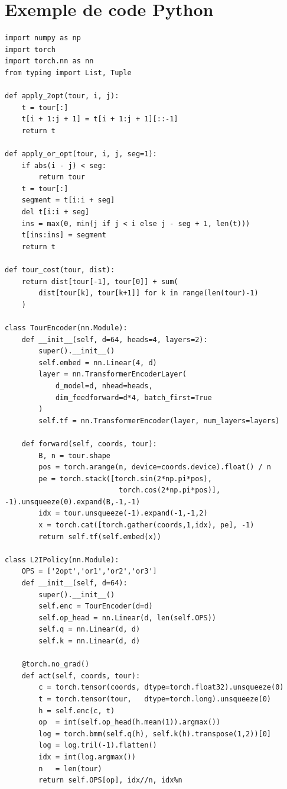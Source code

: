\documentclass[11pt,a4paper]{article}
\begin{document}
\section{Exemple de code Python}

\begin{lstlisting}[caption={L2I minimal : politique Transformer + opérateurs locaux}]
import numpy as np
import torch
import torch.nn as nn
from typing import List, Tuple

def apply_2opt(tour, i, j):
    t = tour[:]
    t[i + 1:j + 1] = t[i + 1:j + 1][::-1]
    return t

def apply_or_opt(tour, i, j, seg=1):
    if abs(i - j) < seg:
        return tour
    t = tour[:]
    segment = t[i:i + seg]
    del t[i:i + seg]
    ins = max(0, min(j if j < i else j - seg + 1, len(t)))
    t[ins:ins] = segment
    return t

def tour_cost(tour, dist):
    return dist[tour[-1], tour[0]] + sum(
        dist[tour[k], tour[k+1]] for k in range(len(tour)-1)
    )

class TourEncoder(nn.Module):
    def __init__(self, d=64, heads=4, layers=2):
        super().__init__()
        self.embed = nn.Linear(4, d)
        layer = nn.TransformerEncoderLayer(
            d_model=d, nhead=heads,
            dim_feedforward=d*4, batch_first=True
        )
        self.tf = nn.TransformerEncoder(layer, num_layers=layers)

    def forward(self, coords, tour):
        B, n = tour.shape
        pos = torch.arange(n, device=coords.device).float() / n
        pe = torch.stack([torch.sin(2*np.pi*pos),
                           torch.cos(2*np.pi*pos)], -1).unsqueeze(0).expand(B,-1,-1)
        idx = tour.unsqueeze(-1).expand(-1,-1,2)
        x = torch.cat([torch.gather(coords,1,idx), pe], -1)
        return self.tf(self.embed(x))

class L2IPolicy(nn.Module):
    OPS = ['2opt','or1','or2','or3']
    def __init__(self, d=64):
        super().__init__()
        self.enc = TourEncoder(d=d)
        self.op_head = nn.Linear(d, len(self.OPS))
        self.q = nn.Linear(d, d)
        self.k = nn.Linear(d, d)

    @torch.no_grad()
    def act(self, coords, tour):
        c = torch.tensor(coords, dtype=torch.float32).unsqueeze(0)
        t = torch.tensor(tour,   dtype=torch.long).unsqueeze(0)
        h = self.enc(c, t)
        op  = int(self.op_head(h.mean(1)).argmax())
        log = torch.bmm(self.q(h), self.k(h).transpose(1,2))[0]
        log = log.tril(-1).flatten()
        idx = int(log.argmax())
        n   = len(tour)
        return self.OPS[op], idx//n, idx%n


\end{lstlisting}
\end{document}
